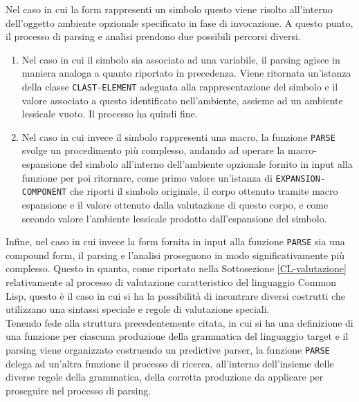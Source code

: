 Nel caso in cui la form rappresenti un simbolo questo viene risolto all’interno
dell’oggetto ambiente opzionale specificato in fase di invocazione. A questo
punto, il processo di parsing e analisi prendono due possibili percorsi diversi.

\begin{enumerate}

\item Nel caso in cui il simbolo sia associato ad una variabile, il parsing
agisce in maniera analoga a quanto riportato in precedenza. Viene ritornata
un’istanza della classe \texttt{CLAST-ELEMENT} adeguata alla rappresentazione
del simbolo e il valore associato a questo identificato nell’ambiente, assieme
ad un ambiente lessicale vuoto. Il processo ha quindi fine.

\item Nel caso in cui invece il simbolo rappresenti una macro, la funzione
\texttt{PARSE} svolge un procedimento più complesso, andando ad operare la
macro-espansione del simbolo all’interno dell’ambiente opzionale fornito in
input alla funzione per poi ritornare, come primo valore un’istanza di \texttt
{EXPANSION-COMPONENT} che riporti il simbolo originale, il corpo ottenuto
tramite macro espansione e il valore ottenuto dalla valutazione di questo corpo,
e come secondo valore l’ambiente lessicale prodotto dall’espansione del simbolo.

\end{enumerate}

Infine, nel caso in cui invece la form fornita in input alla funzione
\texttt{PARSE} sia una compound form, il parsing e l’analisi proseguono in modo
significativamente più complesso. Questo in quanto, come riportato nella
Sottosezione \ref{CL-valutazione} relativamente al processo di valutazione
caratteristico del linguaggio Common Lisp, questo è il caso in cui si ha la
possibilità di incontrare diversi costrutti che utilizzano una sintassi speciale
e regole di valutazione speciali.\\

Tenendo fede alla struttura precedentemente citata, in cui si ha una definizione
di una funzione per ciascuna produzione della grammatica del linguaggio target e
il parsing viene organizzato costruendo un predictive parser, la funzione
\texttt{PARSE} delega ad un’altra funzione il processo di ricerca, all’interno
dell’insieme delle diverse regole della grammatica, della corretta produzione da
applicare per proseguire nel processo di parsing.\\

